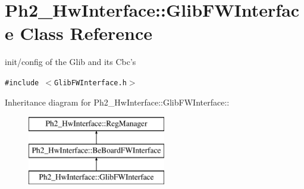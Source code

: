 \hypertarget{class_ph2___hw_interface_1_1_glib_f_w_interface}{
\section{Ph2\_\-Hw\-Interface::Glib\-FWInterface Class Reference}
\label{class_ph2___hw_interface_1_1_glib_f_w_interface}
}
init/config of the Glib and its Cbc's  


{\tt \#include $<$Glib\-FWInterface.h$>$}

Inheritance diagram for Ph2\_\-Hw\-Interface::Glib\-FWInterface::\begin{figure}[H]
\begin{center}
\leavevmode
\includegraphics[height=3cm]{class_ph2___hw_interface_1_1_glib_f_w_interface}
\end{center}
\end{figure}
